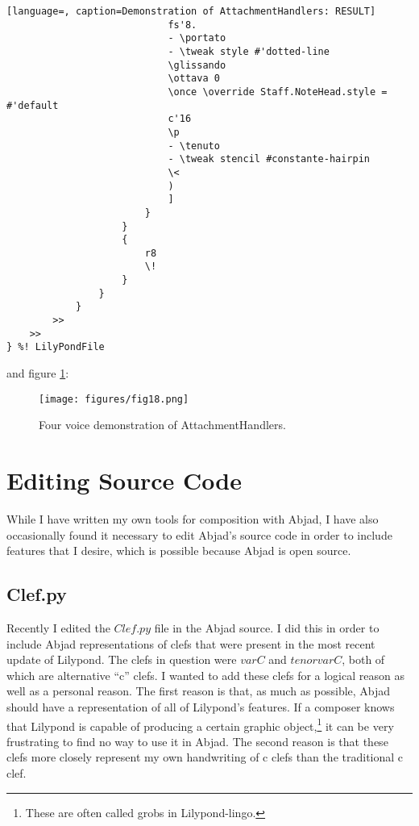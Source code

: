 \begin{lstlisting}[language=, caption=Demonstration of AttachmentHandlers: RESULT]
                            fs'8.
                            - \portato
                            - \tweak style #'dotted-line
                            \glissando
                            \ottava 0
                            \once \override Staff.NoteHead.style = #'default
                            c'16
                            \p
                            - \tenuto
                            - \tweak stencil #constante-hairpin
                            \<
                            )
                            ]
                        }
                    }
                    {
                        r8
                        \!
                    }
                }
            }
        >>
    >>
} %! LilyPondFile
\end{lstlisting}
\doublespace

and figure \ref{fig:quartet}:

\singlespace
\begin{figure}[h]
  \texttt{[image: figures/fig18.png]}
  \caption{Four voice demonstration of AttachmentHandlers.}
  \label{fig:quartet}
\end{figure}
\doublespace

\section{Editing Source Code}

While I have written my own tools for composition with Abjad, I have also occasionally found it necessary to edit Abjad’s source code in order to include features that I desire, which is possible because Abjad is open source.

\subsection{Clef.py}

Recently I edited the $Clef.py$ file in the Abjad source. I did this in order to include Abjad representations of clefs that were present in the most recent update of Lilypond. The clefs in question were $varC$ and $tenorvarC$, both of which are alternative ``c'' clefs. I wanted to add these clefs for a logical reason as well as a personal reason. The first reason is that, as much as possible, Abjad should have a representation of all of Lilypond’s features. If a composer knows that Lilypond is capable of producing a certain graphic object,\footnote{These are often called grobs in Lilypond-lingo.} it can be very frustrating to find no way to use it in Abjad. The second reason is that these clefs more closely represent my own handwriting of c clefs than the traditional c clef.

